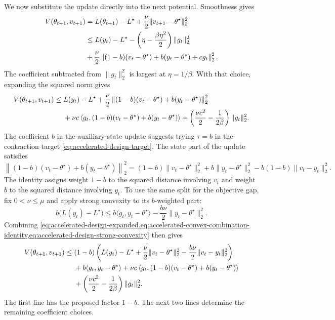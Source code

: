 \documentclass[11pt,twoside]{article}
\theoremstyle{definition}
\theoremstyle{remark}
\begin{document}
We now substitute the update directly into the next potential. Smoothness gives
\begin{align}
 V(\theta_{t+1},v_{t+1})
 &=L(\theta_{t+1})-L^\star
   +\frac\nu2\|v_{t+1}-\theta^\star\|_2^2\notag\\
 &\le L(y_t)-L^\star
 -\left(\eta-\frac{\beta\eta^2}{2}\right)\|g_t\|_2^2\notag\\
 &\quad+\frac\nu2\left\|(1-b)(v_t-\theta^\star)
       +b(y_t-\theta^\star)+c g_t\right\|_2^2.
 \label{eq:accelerated-design-initial-expansion}
\end{align}
The coefficient subtracted from $\|g_t\|_2^2$ is largest at $\eta=1/\beta$.
With that choice, expanding the squared norm gives
\begin{align}
 V(\theta_{t+1},v_{t+1})
 \le{}&L(y_t)-L^\star
 +\frac\nu2\left\|(1-b)(v_t-\theta^\star)
                    +b(y_t-\theta^\star)\right\|_2^2\notag\\
 &+\nu c\left\langle g_t,
          (1-b)(v_t-\theta^\star)+b(y_t-\theta^\star)\right\rangle
 +\left(\frac{\nu c^2}{2}-\frac1{2\beta}\right)\|g_t\|_2^2.
 \label{eq:accelerated-design-expanded}
\end{align}
The coefficient $b$ in the auxiliary-state update suggests trying
$\tau=b$ in the contraction target \cref{eq:accelerated-design-target}. The
state part of the update satisfies
\begin{equation}
 \left\|(1-b)(v_t-\theta^\star)+b(y_t-\theta^\star)\right\|_2^2
 =(1-b)\|v_t-\theta^\star\|_2^2+b\|y_t-\theta^\star\|_2^2
 -b(1-b)\|v_t-y_t\|_2^2.
 \label{eq:accelerated-convex-combination-identity}
\end{equation}
The identity assigns weight $1-b$ to the squared distance involving $v_t$ and
weight $b$ to the squared distance involving $y_t$. To use the same split for
the objective gap, fix $0<\nu\le\mu$ and apply strong convexity to its
$b$-weighted part:
\begin{equation}
 b\bigl(L(y_t)-L^\star\bigr)
 \le b\langle g_t,y_t-\theta^\star\rangle
 -\frac{b\nu}{2}\|y_t-\theta^\star\|_2^2.
 \label{eq:accelerated-design-strong-convexity}
\end{equation}
Combining
\cref{eq:accelerated-design-expanded,eq:accelerated-convex-combination-identity,eq:accelerated-design-strong-convexity}
then gives
\begin{align}
 V(\theta_{t+1},v_{t+1})
 \le{}&(1-b)\left(
 L(y_t)-L^\star+\frac\nu2\|v_t-\theta^\star\|_2^2
 -\frac{b\nu}{2}\|v_t-y_t\|_2^2\right)\notag\\
 &+b\langle g_t,y_t-\theta^\star\rangle
 +\nu c\left\langle g_t,
 (1-b)(v_t-\theta^\star)+b(y_t-\theta^\star)\right\rangle\notag\\
 &+\left(\frac{\nu c^2}{2}-\frac1{2\beta}\right)\|g_t\|_2^2.
 \label{eq:accelerated-design-after-strong-convexity}
\end{align}
The first line has the proposed factor $1-b$. The next two lines determine
the remaining coefficient choices.
\end{document}
